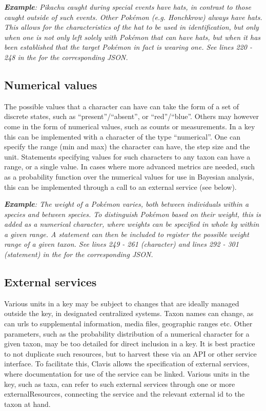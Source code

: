 \documentclass[10pt,letterpaper]{article}
\begin{document}
\textit{\textbf{Example}: Pikachu caught during special events have hats, in contrast to those caught outside of such events. Other Pokémon (e.g. Honchkrow) always have hats. This allows for the characteristics of the hat to be used in identification, but only when one is not only left solely with Pokémon that can have hats, but when it has been established that the target Pokémon in fact is wearing one. See lines 220 - 248 in the  for the corresponding JSON.}
\subsection*{
Numerical values
}
The possible values that a character can have can take the form of a set of discrete states, such as ``present''/``absent'', or ``red''/``blue''. Others may however come in the form of numerical values, such as counts or measurements. In a key this can be implemented with a character of the type ``numerical''. One can specify the range (min and max) the character can have, the step size and the unit. Statements specifying values for such characters to any taxon can have a range, or a single value. In cases where more advanced metrics are needed, such as a probability function over the numerical values for use in Bayesian analysis, this can be implemented through a call to an external service (see below).

\textit{\textbf{Example}: The weight of a Pokémon varies, both between individuals within a species and between species. To distinguish Pokémon based on their weight, this is added as a numerical character, where weights can be specified in whole kg within a given range. A statement can then be included to register the possible weight range of a given taxon. See lines 249 - 261 (character) and lines 292 - 301 (statement) in the  for the corresponding JSON.}
\subsection*{
External services
}
Various units in a key may be subject to changes that are ideally managed outside the key, in designated centralized systems. Taxon names can change, as can urls to supplemental information, media files, geographic ranges etc. Other parameters, such as the probability distribution of a numerical character for a given taxon, may be too detailed for direct inclusion in a key. It is best practice to not duplicate such resources, but to harvest these via an API or other service interface. To facilitate this, Clavis allows the specification of external services, where documentation for use of the service can be linked. Various units in the key, such as taxa, can refer to such external services through one or more externalResources, connecting the service and the relevant external id to the taxon at hand.
\end{document}
